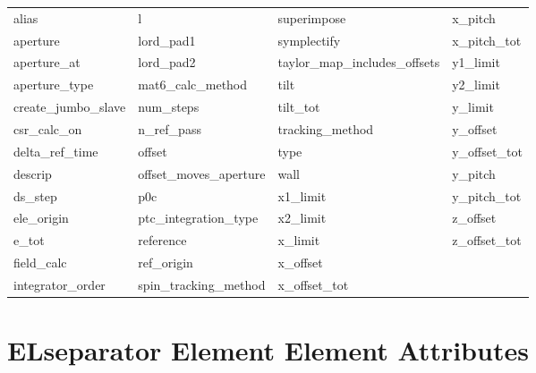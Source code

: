  \begin{tabular}{llll} \toprule
alias                       & l                           & superimpose                 & x_pitch                     \\
aperture                    & lord_pad1                   & symplectify                 & x_pitch_tot                 \\
aperture_at                 & lord_pad2                   & taylor_map_includes_offsets & y1_limit                    \\
aperture_type               & mat6_calc_method            & tilt                        & y2_limit                    \\
create_jumbo_slave          & num_steps                   & tilt_tot                    & y_limit                     \\
csr_calc_on                 & n_ref_pass                  & tracking_method             & y_offset                    \\
delta_ref_time              & offset                      & type                        & y_offset_tot                \\
descrip                     & offset_moves_aperture       & wall                        & y_pitch                     \\
ds_step                     & p0c                         & x1_limit                    & y_pitch_tot                 \\
ele_origin                  & ptc_integration_type        & x2_limit                    & z_offset                    \\
e_tot                       & reference                   & x_limit                     & z_offset_tot                \\
field_calc                  & ref_origin                  & x_offset                    &                             \\
integrator_order            & spin_tracking_method        & x_offset_tot                &                             \\
 \bottomrule
 \end{tabular}
 \vfill
 
 \section{ELseparator Element Element Attributes}
 \label{s:list.elseparator}
 
